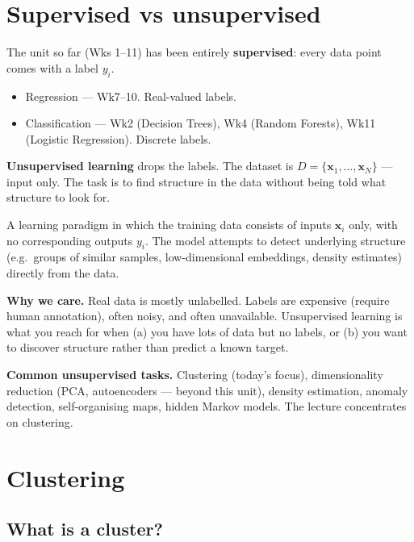 \documentclass[11pt, a4paper]{article}
\begin{document}
\section{Supervised vs unsupervised}

The unit so far (Wks 1--11) has been entirely \textbf{supervised}: every data point comes with a label $y_i$.
\begin{itemize}
  \item Regression — Wk7--10. Real-valued labels.
  \item Classification — Wk2 (Decision Trees), Wk4 (Random Forests), Wk11 (Logistic Regression). Discrete labels.
\end{itemize}

\textbf{Unsupervised learning} drops the labels. The dataset is $D = \{\mathbf{x}_1, \ldots, \mathbf{x}_N\}$ — input only. The task is to find structure in the data without being told what structure to look for.

\begin{defbox}
A learning paradigm in which the training data consists of inputs $\mathbf{x}_i$ only, with no corresponding outputs $y_i$. The model attempts to detect underlying structure (e.g.\ groups of similar samples, low-dimensional embeddings, density estimates) directly from the data.
\end{defbox}

\textbf{Why we care.} Real data is mostly unlabelled. Labels are expensive (require human annotation), often noisy, and often unavailable. Unsupervised learning is what you reach for when (a) you have lots of data but no labels, or (b) you want to discover structure rather than predict a known target.

\textbf{Common unsupervised tasks.} Clustering (today's focus), dimensionality reduction (PCA, autoencoders — beyond this unit), density estimation, anomaly detection, self-organising maps, hidden Markov models. The lecture concentrates on clustering.

\section{Clustering}

\subsection{What is a cluster?}
\end{document}
